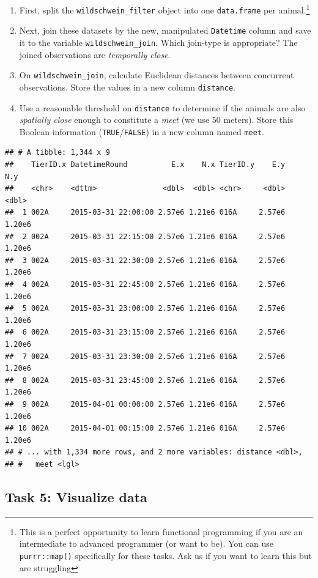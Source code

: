 \documentclass[]{book}
\providecommand{\tightlist}{%
  \setlength{\itemsep}{0pt}\setlength{\parskip}{0pt}}
\let\rmarkdownfootnote\footnote%
\def\footnote{\protect\rmarkdownfootnote}
\begin{document}
\begin{enumerate}
\def\labelenumi{\arabic{enumi}.}
\tightlist
\item
  First, split the \texttt{wildschwein\_filter} object into one \texttt{data.frame} per animal.\footnote{This is a perfect opportunity to learn functional programming if you are an intermediate to advanced programmer (or want to be). You can use \texttt{purrr::map()} specifically for these tasks. Ask us if you want to learn this but are struggling}
\item
  Next, join these datasets by the new, manipulated \texttt{Datetime} column and save it to the variable \texttt{wildschwein\_join}. Which join-type is appropriate? The joined observations are \emph{temporally close}.
\item
  On \texttt{wildschwein\_join}, calculate Euclidean distances between concurrent observations. Store the values in a new column \texttt{distance}.
\item
  Use a reasonable threshold on \texttt{distance} to determine if the animals are also \emph{spatially close} enough to constitute a \emph{meet} (we use 50 meters). Store this Boolean information (\texttt{TRUE}/\texttt{FALSE}) in a new column named \texttt{meet}.
\end{enumerate}

\begin{verbatim}
## # A tibble: 1,344 x 9
##    TierID.x DatetimeRound          E.x    N.x TierID.y    E.y    N.y
##    <chr>    <dttm>               <dbl>  <dbl> <chr>     <dbl>  <dbl>
##  1 002A     2015-03-31 22:00:00 2.57e6 1.21e6 016A     2.57e6 1.20e6
##  2 002A     2015-03-31 22:15:00 2.57e6 1.21e6 016A     2.57e6 1.20e6
##  3 002A     2015-03-31 22:30:00 2.57e6 1.21e6 016A     2.57e6 1.20e6
##  4 002A     2015-03-31 22:45:00 2.57e6 1.21e6 016A     2.57e6 1.20e6
##  5 002A     2015-03-31 23:00:00 2.57e6 1.21e6 016A     2.57e6 1.20e6
##  6 002A     2015-03-31 23:15:00 2.57e6 1.21e6 016A     2.57e6 1.20e6
##  7 002A     2015-03-31 23:30:00 2.57e6 1.21e6 016A     2.57e6 1.20e6
##  8 002A     2015-03-31 23:45:00 2.57e6 1.21e6 016A     2.57e6 1.20e6
##  9 002A     2015-04-01 00:00:00 2.57e6 1.21e6 016A     2.57e6 1.20e6
## 10 002A     2015-04-01 00:15:00 2.57e6 1.21e6 016A     2.57e6 1.20e6
## # ... with 1,334 more rows, and 2 more variables: distance <dbl>,
## #   meet <lgl>
\end{verbatim}

\hypertarget{task-5-visualize-data}{%
\subsection{Task 5: Visualize data}\label{task-5-visualize-data}}
\end{document}
